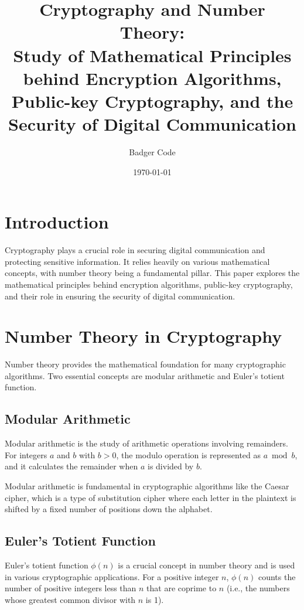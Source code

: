 \documentclass{article}
\title{Cryptography and Number Theory: \\
       Study of Mathematical Principles behind Encryption Algorithms, \\
       Public-key Cryptography, and the Security of Digital Communication}
\author{Badger Code}
\date{\today}
\begin{document}
\maketitle

\section{Introduction}
Cryptography plays a crucial role in securing digital communication and protecting sensitive information. It relies heavily on various mathematical concepts, with number theory being a fundamental pillar. This paper explores the mathematical principles behind encryption algorithms, public-key cryptography, and their role in ensuring the security of digital communication.

\section{Number Theory in Cryptography}
Number theory provides the mathematical foundation for many cryptographic algorithms. Two essential concepts are modular arithmetic and Euler's totient function.

\subsection{Modular Arithmetic}
Modular arithmetic is the study of arithmetic operations involving remainders. For integers $a$ and $b$ with $b > 0$, the modulo operation is represented as $a \bmod b$, and it calculates the remainder when $a$ is divided by $b$.

\begin{center}
\end{center}

Modular arithmetic is fundamental in cryptographic algorithms like the Caesar cipher, which is a type of substitution cipher where each letter in the plaintext is shifted by a fixed number of positions down the alphabet.

\subsection{Euler's Totient Function}
Euler's totient function $\phi(n)$ is a crucial concept in number theory and is used in various cryptographic applications. For a positive integer $n$, $\phi(n)$ counts the number of positive integers less than $n$ that are coprime to $n$ (i.e., the numbers whose greatest common divisor with $n$ is 1).
\end{document}
